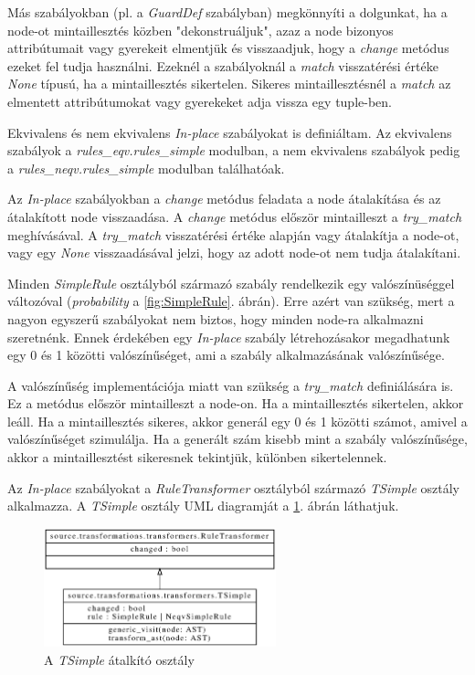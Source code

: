 Más szabályokban (pl. a \emph{GuardDef} szabályban) megkönnyíti a dolgunkat,
ha a node-ot mintaillesztés közben "dekonstruáljuk", 
azaz a node bizonyos attribútumait vagy gyerekeit elmentjük és visszaadjuk,
hogy a \emph{change} metódus ezeket fel tudja használni.
Ezeknél a szabályoknál a \emph{match} visszatérési értéke \emph{None} típusú,
ha a mintaillesztés sikertelen.
Sikeres mintaillesztésnél a \emph{match} az elmentett attribútumokat vagy gyerekeket adja vissza
egy tuple-ben.

Ekvivalens és nem ekvivalens \emph{In-place} szabályokat is definiáltam.
Az ekvivalens szabályok
a \emph{rules\_eqv.rules\_simple} modulban,
a nem ekvivalens szabályok pedig
a \emph{rules\_neqv.rules\_simple} modulban
találhatóak.

Az \emph{In-place} szabályokban a \emph{change} metódus feladata a node átalakítása
és az átalakított node visszaadása.
A \emph{change} metódus először mintailleszt a \emph{try\_match} meghívásával.
A \emph{try\_match} visszatérési értéke alapján vagy átalakítja a node-ot,
vagy egy \emph{None} visszaadásával jelzi, hogy az adott node-ot nem tudja átalakítani.

Minden \emph{SimpleRule} osztályból származó szabály rendelkezik egy valószínüséggel változóval
(\emph{probability} a \ref{fig:SimpleRule}. ábrán).
Erre azért van szükség, mert a nagyon egyszerű szabályokat nem biztos,
hogy minden node-ra alkalmazni szeretnénk.
Ennek érdekében egy \emph{In-place} szabály létrehozásakor megadhatunk
egy 0 és 1 közötti valószínűséget, ami a szabály alkalmazásának valószínűsége.

A valószínűség implementációja miatt van szükség a \emph{try\_match} definiálására is.
Ez a metódus először mintailleszt a node-on.
Ha a mintaillesztés sikertelen, akkor leáll.
Ha a mintaillesztés sikeres,
akkor generál egy 0 és 1 közötti számot,
amivel a valószínűséget szimulálja.
Ha a generált szám kisebb mint a szabály valószínűsége,
akkor a mintaillesztést sikeresnek tekintjük, különben sikertelennek.

Az \emph{In-place} szabályokat
a \emph{RuleTransformer} osztályból származó \emph{TSimple} osztály alkalmazza.
A \emph{TSimple} osztály UML diagramját a \ref{fig:TSimple}. ábrán láthatjuk.

\begin{figure}[H]
	\centering
	\includegraphics[width=0.6\textwidth]{images/uml/TSimple.eps}
	\caption{A \emph{TSimple} átalkító osztály}
	\label{fig:TSimple}
\end{figure}

